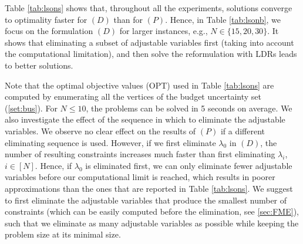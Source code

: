 \documentclass[fleqn,isre,blindrev]{informs4}
\begin{document}
		
		Table \ref{tab:lsons} shows that, throughout all the experiments, solutions converge to optimality faster for $(D)$ than for $(P)$. Hence, in Table \ref{tab:lsonb}, we focus on the formulation $(D)$ for larger instances, e.g., $N\in \{15, 20,30 \}$. It shows that eliminating a subset of adjustable variables first (taking into account the computational limitation), and then solve the reformulation with LDRs leads to better solutions.
		
 {	Note that the optimal objective values (OPT) used in Table \ref{tab:lsons} are computed by enumerating all the vertices of the budget uncertainty set (\ref{set:bus}). For $N \le10 $, the problems can be solved in 5 seconds on average. We also investigate the effect of the sequence in which to eliminate the adjustable variables. We observe no clear effect on the results of $(P)$ if a different eliminating sequence is used. However, if we first eliminate $\lambda_0$ in $(D)$, the number of resulting constraints increases much faster than first eliminating  $\lambda_i$, $i\in [N]$. Hence, if $\lambda_0$ is eliminated first, we can only eliminate fewer adjustable variables before our computational limit is reached, which results in poorer approximations than the ones that are reported in Table \ref{tab:lsons}. We suggest to first eliminate the adjustable variables that produce the smallest number of constraints (which can be easily computed before the elimination, see \textsection \ref{sec:FME}), such that we eliminate as many adjustable variables as possible while keeping the problem size at its minimal size. }
		
\end{document}
